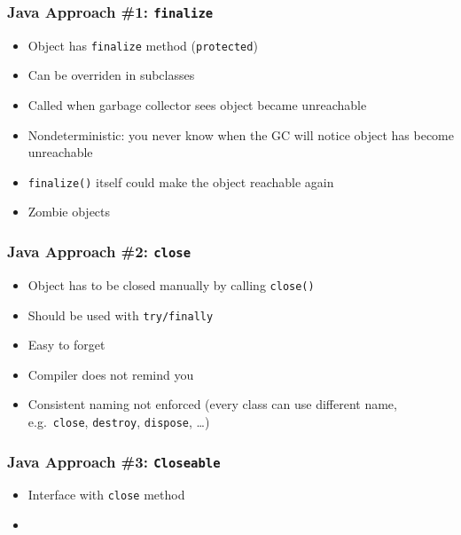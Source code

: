 \documentclass{../ucll-slides}
\begin{document}
\begin{frame}
  \frametitle{Java Approach \#1: {\tt finalize}}
  \begin{itemize}
    \item Object has {\tt finalize} method ({\tt protected})
    \item Can be overriden in subclasses
    \item Called when garbage collector sees object became unreachable
  \end{itemize}
  \vskip5mm
  \begin{itemize}
    \item Nondeterministic: you never know when the GC will notice object has become unreachable
    \item {\tt finalize()} itself could make the object reachable again
    \item Zombie objects
  \end{itemize}
\end{frame}

\begin{frame}
  \frametitle{Java Approach \#2: {\tt close}}
  \begin{itemize}
    \item Object has to be closed manually by calling {\tt close()}
    \item Should be used with {\tt try/finally}
  \end{itemize}
  \vskip5mm
  \begin{itemize}
    \item Easy to forget
    \item Compiler does not remind you
    \item Consistent naming not enforced (every class can use different name, e.g.\ {\tt close}, {\tt destroy}, {\tt dispose}, \dots)
  \end{itemize}
\end{frame}

\begin{frame}
  \frametitle{Java Approach \#3: {\tt Closeable}}
  \begin{itemize}
    \item Interface with {\tt close} method
    \item {}
  \end{itemize}
  \vskip5mm
\end{frame}
\end{document}
